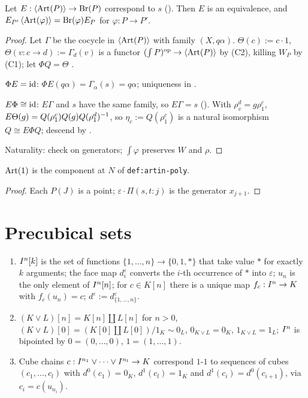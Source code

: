\documentclass[11pt]{article}
\newcommand{\altw}[3]{\Pi(#1,#2:#3)}
\begin{document}
\begin{theorem}\label{thm:A}
  Let $E : \left\langle \operatorname{Art}(P) \right\rangle \to \operatorname{Br}(P)$ correspond to $s$ (). Then $E$ is
  an equivalence, and $E_{P'}\left\langle \operatorname{Art}(\varphi) \right\rangle = \operatorname{Br}(\varphi)E_P$ for $\varphi : P \to P'$.
\end{theorem}
\begin{proof}
  Let $\Gamma$ be the cocycle in $\left\langle \operatorname{Art}(P) \right\rangle$ with family $(X, q\alpha)$. $\Theta(c) := c\cdot1$,
  $\Theta(v : c \to d) := \Gamma_d(v)$ is a functor $(\int P)^{\mathrm{op}} \to \left\langle \operatorname{Art}(P) \right\rangle$ by (C2),
  killing $W_P$ by (C1); let $\Phi Q = \Theta$ \cite[\S I.1.1, Lem.~I.1.2]{GZ}.

  $\Phi E = \operatorname{id}$: $\Phi E(q\alpha) = \Gamma_\alpha(s) = q\alpha$; uniqueness in
  \cite[Lem.~2.1.3, Lem.~2.3.4]{Polygraphs}.

  $E\Phi \cong \operatorname{id}$: $E\Gamma$ and $s$ have the same family, so $E\Gamma = s$
  (). With $\rho^d_v = g\rho^c_1$, $E\Theta(g) = Q(\rho^c_1)Q(g)Q(\rho^d_1)^{-1}$,
  so $\eta_c := Q(\rho^c_1)$ is a natural isomorphism $Q \cong E\Phi Q$; descend by
  \cite[Lem.~I.1.2]{GZ}.

  Naturality: check on generators; $\int\varphi$ preserves $W$ and $\rho$.
\end{proof}

\begin{corollary}\label{cor:artin}
  $\operatorname{Art}(1)$ is the component at $N$ of \texttt{def:artin-poly}.
\end{corollary}
\begin{proof}
  Each $P(J)$ is a point; $\varepsilon\cdot\altw stj$ is the generator $x_{j+1}$.
\end{proof}

\section{Precubical sets}\label{sec:cubes}

\begin{proposition}\label{prop:z2}
  \begin{enumerate}
    \item \cite[\S2.4]{Z2} $I^{n}[k]$ is the set of functions $\{1,\dots,n\} \to \{0,1,*\}$ that take value $*$
      for exactly $k$ arguments; the face map $d^\varepsilon_i$ converts the $i$-th occurrence of
      $*$ into $\varepsilon$; $u_n$ is the only element of $I^{n}[n]$; for $c \in K[n]$ there
      is a unique map $f_c : I^{n} \to K$ with $f_c(u_n) = c$; $d^\varepsilon :=
      d^\varepsilon_{\{1,\dots,n\}}$.
    \item \cite[Def.~7.1, Def.~7.2]{Z2} $(K \vee L)[n] = K[n] \amalg L[n]$ for $n > 0$, $(K \vee L)[0] = (K[0] \amalg L[0])/1_K
      \sim 0_L$, $0_{K\vee L} = 0_K$, $1_{K \vee L} = 1_L$; $I^{n}$ is bipointed by $0 =
      (0,\dots,0)$, $1 = (1,\dots,1)$.
    \item \cite[\S7, after Def.~7.3]{Z2} Cube chains $c : I^{n_1} \vee \cdots \vee I^{n_l} \to K$ correspond $1$-$1$ to
      sequences of cubes $(c_1,\dots,c_l)$ with $d^0(c_1) = 0_K$, $d^1(c_l) = 1_K$ and $d^1(c_i) =
      d^0(c_{i+1})$, via $c_i = c(u_{n_i})$.
  \end{enumerate}
\end{proposition}
\end{document}
